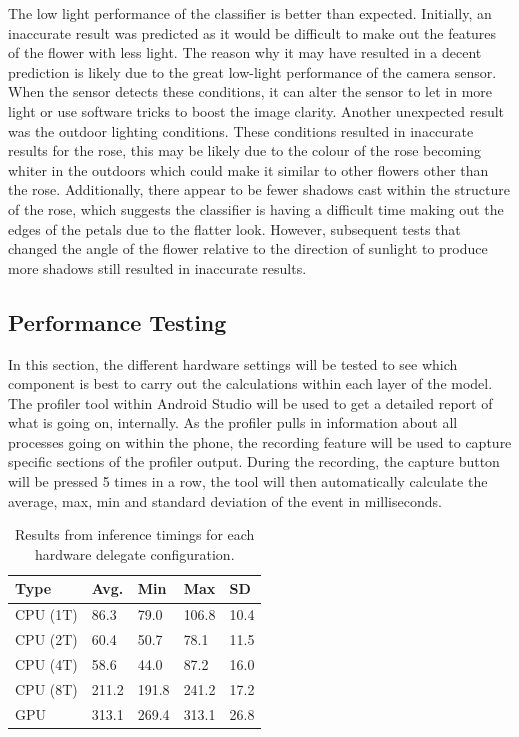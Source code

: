 \documentclass[12pt,a4paper]{report}
\begin{document}
The low light performance of the classifier is better than expected. Initially, an inaccurate result was predicted as it
would be difficult to make out the features of the flower with less light. The reason why it may have resulted in a 
decent prediction is likely due to the great low-light performance of the camera sensor. When the sensor detects these 
conditions, it can alter the sensor to let in more light or use software tricks to boost the image clarity. Another 
unexpected result was the outdoor lighting conditions. These conditions resulted in inaccurate results for the rose, 
this may be likely due to the colour of the rose becoming whiter in the outdoors which could make it similar to other 
flowers other than the rose. Additionally, there appear to be fewer shadows cast within the structure of the rose, 
which suggests the classifier is having a difficult time making out the edges of the petals due to the flatter look. 
However, subsequent tests that changed the angle of the flower relative to the direction of sunlight to produce more 
shadows still resulted in inaccurate results. 

\subsection{Performance Testing}

In this section, the different hardware settings will be tested to see which component is best to carry out the 
calculations within each layer of the model. The profiler tool within Android Studio will be used to get a detailed 
report of what is going on, internally. As the profiler pulls in information about all processes going on within the 
phone, the recording feature will be used to capture specific sections of the profiler output. During the recording, 
the capture button will be pressed 5 times in a row, the tool will then automatically calculate the average, max, min 
and standard deviation of the event in milliseconds.

\begin{table}[h!]
    \centering
    \begin{tabular}{ |l|l|l|l|l| }
        \hline
        Type & Avg. & Min & Max & SD \\
        \hline
        \hline
        CPU (1T) & 86.3 & 79.0 & 106.8 & 10.4 \\
        \hline
        CPU (2T) & 60.4 & 50.7 & 78.1 & 11.5 \\
        \hline
        CPU (4T) & 58.6 & 44.0 & 87.2 & 16.0 \\
        \hline
        CPU (8T) & 211.2 & 191.8 & 241.2 & 17.2 \\
        \hline
        GPU & 313.1 & 269.4 & 313.1 & 26.8 \\
        \hline

        
    \end{tabular}
    \caption{Results from inference timings for each hardware delegate configuration.}
    \label{table:timings}
\end{table}
\end{document}
